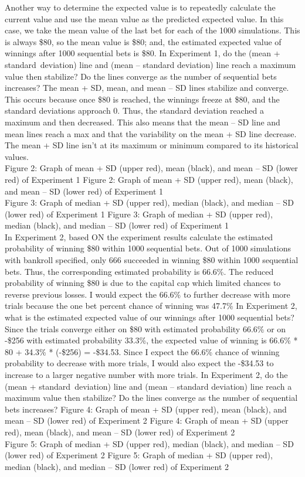 \documentclass{article}
\begin{document}
Another way to determine the expected value is to repeatedly calculate the current value and use the mean value as the predicted expected value. In this case, we take the mean value of the last bet for each of the 1000 simulations. This is always \$80, so the mean value is \$80; and, the estimated expected value of winnings after 1000 sequential bets is \$80.
In Experiment 1, do the (mean + standard deviation) line and (mean – standard deviation) line reach a maximum value then stabilize? Do the lines converge as the number of sequential bets increases?
The mean + SD, mean, and mean – SD lines stabilize and converge. This occurs because once \$80 is reached, the winnings freeze at \$80, and the standard deviations approach 0. Thus, the standard deviation reached a maximum and then decreased. This also means that the mean – SD line and mean lines reach a max and that the variability on the mean + SD line decrease. The mean + SD line isn’t at its maximum or minimum compared to its historical values.\\

Figure 2: Graph of mean + SD (upper red), mean (black), and mean – SD (lower red) of Experiment 1
Figure 2: Graph of mean + SD (upper red), mean (black), and mean – SD (lower red) of Experiment 1\\

Figure 3: Graph of median + SD (upper red), median (black), and median – SD (lower red) of Experiment 1
Figure 3: Graph of median + SD (upper red), median (black), and median – SD (lower red) of Experiment 1\\

In Experiment 2, based ON the experiment results calculate the estimated probability of winning \$80 within 1000 sequential bets.
Out of 1000 simulations with bankroll specified, only 666 succeeded in winning \$80 within 1000 sequential bets. Thus, the corresponding estimated probability is 66.6\%. The reduced probability of winning \$80 is due to the capital cap which limited chances to reverse previous losses. I would expect the 66.6\% to further decrease with more trials because the one bet percent chance of winning was 47.7\%
In Experiment 2, what is the estimated expected value of our winnings after 1000 sequential bets?
Since the trials converge either on \$80 with estimated probability 66.6\% or on -\$256 with estimated probability 33.3\%, the expected value of winning is 66.6\% * 80 + 34.3\% * (-\$256) = -\$34.53. Since I expect the 66.6\% chance of winning probability to decrease with more trials, I would also expect the -\$34.53 to increase to a larger negative number with more trials.
In Experiment 2, do the (mean + standard deviation) line and (mean – standard deviation) line reach a maximum value then stabilize? Do the lines converge as the number of sequential bets increases?
Figure 4: Graph of mean + SD (upper red), mean (black), and mean – SD (lower red) of Experiment 2
Figure 4: Graph of mean + SD (upper red), mean (black), and mean – SD (lower red) of Experiment 2\\

Figure 5: Graph of median + SD (upper red), median (black), and median – SD (lower red) of Experiment 2
Figure 5: Graph of median + SD (upper red), median (black), and median – SD (lower red) of Experiment 2\\
\end{document}
